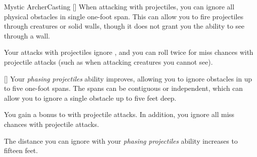 \begin{feat}{Mystic Archer}{Casting}
        [] When attacking with projectiles, you can ignore all physical obstacles in single one-foot span.
        This can allow you to fire projectiles through creatures or solid walls, though it does not grant you the ability to see through a wall.

         Your attacks with projectiles ignore , and you can roll twice for miss chances with projectile attacks (such as when attacking creatures you cannot see).

        [] Your \textit{phasing projectiles} ability improves, allowing you to ignore obstacles in up to five one-foot spans.
        The spans can be contiguous or independent, which can allow you to ignore a single obstacle up to five feet deep.

         You gain a  bonus to  with projectile attacks.
        In addition, you ignore all miss chances with projectile attacks.

         The distance you can ignore with your \textit{phasing projectiles} ability increases to fifteen feet.
    \end{feat}

